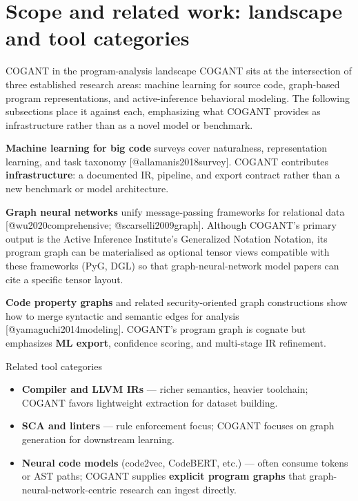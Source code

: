 \documentclass[
  ignorenonframetext,
]{beamer}
\author{\texorpdfstring{}{}}
\date{}
\providecommand{\tightlist}{%
  \setlength{\itemsep}{0pt}\setlength{\parskip}{0pt}}
\begin{document}
\section{Scope and related work: landscape and tool
categories}\label{scope-and-related-work-landscape-and-tool-categories}

\begin{frame}{COGANT in the program-analysis landscape}
\protect{}\label{cogant-in-the-program-analysis-landscape}
COGANT sits at the intersection of three established research areas:
machine learning for source code, graph-based program representations,
and active-inference behavioral modeling. The following subsections
place it against each, emphasizing what COGANT provides as
infrastructure rather than as a novel model or benchmark.

\textbf{Machine learning for big code} surveys cover naturalness,
representation learning, and task taxonomy {[}@allamanis2018survey{]}.
COGANT contributes \textbf{infrastructure}: a documented IR, pipeline,
and export contract rather than a new benchmark or model architecture.

\textbf{Graph neural networks} unify message-passing frameworks for
relational data {[}@wu2020comprehensive; @scarselli2009graph{]}.
Although COGANT's primary output is the Active Inference Institute's
Generalized Notation Notation, its program graph can be materialised as
optional tensor views compatible with these frameworks (PyG, DGL) so
that graph-neural-network model papers can cite a specific tensor
layout.

\textbf{Code property graphs} and related security-oriented graph
constructions show how to merge syntactic and semantic edges for
analysis {[}@yamaguchi2014modeling{]}. COGANT's program graph is cognate
but emphasizes \textbf{ML export}, confidence scoring, and multi-stage
IR refinement.
\end{frame}

\begin{frame}{Related tool categories}
\protect{}\label{related-tool-categories}
\begin{itemize}
\tightlist
\item
  \textbf{Compiler and LLVM IRs} --- richer semantics, heavier
  toolchain; COGANT favors lightweight extraction for dataset building.
\item
  \textbf{SCA and linters} --- rule enforcement focus; COGANT focuses on
  graph generation for downstream learning.
\item
  \textbf{Neural code models} (code2vec, CodeBERT, etc.) --- often
  consume tokens or AST paths; COGANT supplies \textbf{explicit program
  graphs} that graph-neural-network-centric research can ingest
  directly.
\end{itemize}
\end{frame}
\end{document}
